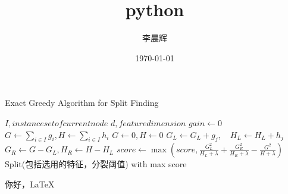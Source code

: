 \documentclass[UTF8]{article}%
\title{\heiti python}
\author{\kaishu 李晨辉}
\date{\today}
\begin{document}
	\maketitle %
		\begin{algorithm}[b]
		\caption{Exact Greedy Algorithm for Split Finding} %
		\label{algMergeSubCluste}
		\begin{algorithmic}[1]
			\REQUIRE $I, instance set of current node$
			\REQUIRE $d, feature dimension$
			\STATE$gain \gets 0$
			\STATE$G \leftarrow \sum_{i \in I} g_{i}, H \leftarrow \sum_{i \in I} h_{i}$
				\STATE$G \leftarrow 0, H \leftarrow 0$
					\STATE$G_{L} \leftarrow G_{L}+g_{j}, \quad H_{L} \leftarrow H_{L}+h_{j}$
					\STATE$G_{R} \leftarrow G-G_{L}, H_{R} \leftarrow H-H_{L}$
					\STATE$score\leftarrow \max \left(score,\frac{G_{L}^{2}}{H_{L}+\lambda}+\frac{G_{R}^{2}}{H_{R}+\lambda}-\frac{G^{2}}{H+\lambda}\right)$
				\ENDFOR
			\ENDFOR
		\ENSURE Split(包括选用的特征，分裂阈值) with max score
		\end{algorithmic}
	\end{algorithm}

	你好，\LaTeX
\end{document}
